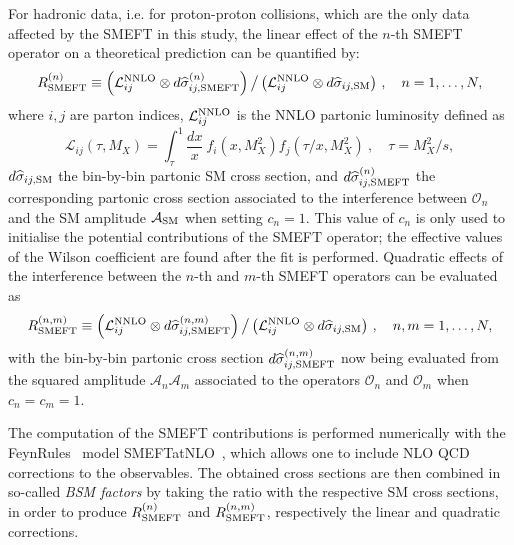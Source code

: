 \documentclass[withindex,glossary]{cam-thesis}
\begin{document}
For hadronic data, i.e. for proton-proton collisions, which are the only data affected by the SMEFT in this study,
 the linear effect of the $n$-th SMEFT operator on a theoretical prediction can be quantified by:
%
\begin{equation}
  \label{eq:mult_k_fac_app1}
   R_{\rm SMEFT}^{(n)} \equiv \displaystyle \left( {\cal L}_{ ij}^{\rm NNLO} \otimes d\widehat{\sigma}_{ij,{\rm SMEFT}}^{(n)}\right)
 \big/ \left( {\cal L}_{ ij}^{\rm NNLO} \otimes d\widehat{\sigma}_{ij,{\rm SM}} \right) \, , \quad
 n=1,\ldots, N,
\end{equation}
%
where $i, j$ are parton indices, ${\cal L}_{ ij}^{\rm NNLO}$ is the NNLO partonic luminosity defined as 
%
\begin{equation}
\label{eq:lumidef}
\mathcal{L}_{ij}(\tau,M_X) = \int_{\tau}^1 \frac{d x}{x}~f_i (x,M_X^2) f_j (\tau/x,M_X^2) ~, \quad \tau=M_X^2/s,
\end{equation}
%
$d\widehat{\sigma}_{ij,{\rm SM}}$ the bin-by-bin partonic SM cross section, and $d\widehat{\sigma}_{ij,{\rm SMEFT}}^{(n)}$
the corresponding partonic cross section associated to the interference between 
$\mathcal{O}_n$ and the SM amplitude $\mathcal{A}_{\rm SM}$ when setting $c_n = 1$. This value of $c_n$ 
is only used to initialise the potential contributions of the
SMEFT operator; the effective values of the Wilson coefficient 
are found after the fit is performed. 
%
Quadratic effects of the interference between the $n$-th and $m$-th
SMEFT operators can be evaluated as
%
\begin{equation}
  \label{eq:mult_k_fac_app2}
  R_{\rm SMEFT}^{(n,m)} \equiv \displaystyle \left( {\cal L}_{ ij}^{\rm NNLO} \otimes d\widehat{\sigma}_{ij,{\rm SMEFT}}^{(n,m)}\right)
  \big/ \left( {\cal L}_{ ij}^{\rm NNLO} \otimes d\widehat{\sigma}_{ij,{\rm SM}} \right) \, , \quad
 n,m=1, \ldots, N  ,
\end{equation}
with the bin-by-bin partonic cross section
$d\widehat{\sigma}_{ij,{\rm SMEFT}}^{(n,m)}$ now being evaluated from the squared amplitude $\mathcal{A}_n\mathcal{A}_m$
associated to the operators $\mathcal{O}_n$ and $\mathcal{O}_m$ when $c_n = c_m = 1$.

The computation of the SMEFT contributions is
performed numerically with the FeynRules~\cite{Alloul:2013bka} model SMEFTatNLO~\cite{Degrande:2020evl}, which allows one to include NLO QCD corrections to the observables. The obtained cross sections are then combined in so-called \textit{BSM factors} by taking the ratio with the respective SM cross sections, in order to 
produce $R_{\rm SMEFT}^{(n)}$ and $R_{\rm SMEFT}^{(n,m)}$, respectively the linear and quadratic corrections.
\end{document}
